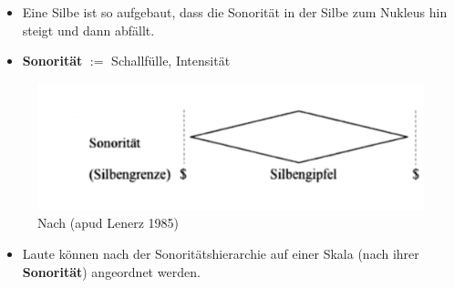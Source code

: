 \begin{frame}

\begin{itemize}
	\item Eine Silbe ist so aufgebaut, dass die Sonorität in der Silbe zum Nukleus hin steigt und dann abfällt.

	\item \textbf{Sonorität} $:=$ Schallfülle, Intensität

\end{itemize}

\begin{figure}
\centering
\includegraphics[scale=.2]{material/03bSonoritaetRamers}
\caption{Nach \citet[93]{Ramers08a} (apud Lenerz 1985)}
\end{figure}


\begin{itemize}
	\item Laute können nach der Sonoritätshierarchie auf einer Skala (nach ihrer \textbf{Sonorität}) angeordnet werden.
\end{itemize}

\end{frame}




